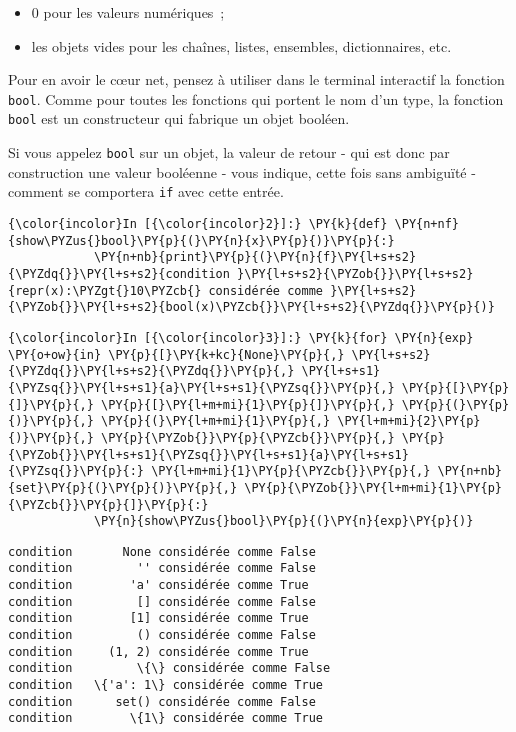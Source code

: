 \begin{itemize}
\tightlist
\item
  0 pour les valeurs numériques~;
\item
  les objets vides pour les chaînes, listes, ensembles, dictionnaires,
  etc.
\end{itemize}

    Pour en avoir le cœur net, pensez à utiliser dans le terminal interactif
la fonction \texttt{bool}. Comme pour toutes les fonctions qui portent
le nom d'un type, la fonction \texttt{bool} est un constructeur qui
fabrique un objet booléen.

Si vous appelez \texttt{bool} sur un objet, la valeur de retour - qui
est donc par construction une valeur booléenne - vous indique, cette
fois sans ambiguïté - comment se comportera \texttt{if} avec cette
entrée.

    \begin{Verbatim}[commandchars=\\\{\},frame=single,framerule=0.3mm,rulecolor=\color{cellframecolor}]
{\color{incolor}In [{\color{incolor}2}]:} \PY{k}{def} \PY{n+nf}{show\PYZus{}bool}\PY{p}{(}\PY{n}{x}\PY{p}{)}\PY{p}{:}
            \PY{n+nb}{print}\PY{p}{(}\PY{n}{f}\PY{l+s+s2}{\PYZdq{}}\PY{l+s+s2}{condition }\PY{l+s+s2}{\PYZob{}}\PY{l+s+s2}{repr(x):\PYZgt{}10\PYZcb{} considérée comme }\PY{l+s+s2}{\PYZob{}}\PY{l+s+s2}{bool(x)\PYZcb{}}\PY{l+s+s2}{\PYZdq{}}\PY{p}{)}
\end{Verbatim}


    \begin{Verbatim}[commandchars=\\\{\},frame=single,framerule=0.3mm,rulecolor=\color{cellframecolor}]
{\color{incolor}In [{\color{incolor}3}]:} \PY{k}{for} \PY{n}{exp} \PY{o+ow}{in} \PY{p}{[}\PY{k+kc}{None}\PY{p}{,} \PY{l+s+s2}{\PYZdq{}}\PY{l+s+s2}{\PYZdq{}}\PY{p}{,} \PY{l+s+s1}{\PYZsq{}}\PY{l+s+s1}{a}\PY{l+s+s1}{\PYZsq{}}\PY{p}{,} \PY{p}{[}\PY{p}{]}\PY{p}{,} \PY{p}{[}\PY{l+m+mi}{1}\PY{p}{]}\PY{p}{,} \PY{p}{(}\PY{p}{)}\PY{p}{,} \PY{p}{(}\PY{l+m+mi}{1}\PY{p}{,} \PY{l+m+mi}{2}\PY{p}{)}\PY{p}{,} \PY{p}{\PYZob{}}\PY{p}{\PYZcb{}}\PY{p}{,} \PY{p}{\PYZob{}}\PY{l+s+s1}{\PYZsq{}}\PY{l+s+s1}{a}\PY{l+s+s1}{\PYZsq{}}\PY{p}{:} \PY{l+m+mi}{1}\PY{p}{\PYZcb{}}\PY{p}{,} \PY{n+nb}{set}\PY{p}{(}\PY{p}{)}\PY{p}{,} \PY{p}{\PYZob{}}\PY{l+m+mi}{1}\PY{p}{\PYZcb{}}\PY{p}{]}\PY{p}{:}
            \PY{n}{show\PYZus{}bool}\PY{p}{(}\PY{n}{exp}\PY{p}{)}
\end{Verbatim}


    \begin{Verbatim}[commandchars=\\\{\},frame=single,framerule=0.3mm,rulecolor=\color{cellframecolor}]
condition       None considérée comme False
condition         '' considérée comme False
condition        'a' considérée comme True
condition         [] considérée comme False
condition        [1] considérée comme True
condition         () considérée comme False
condition     (1, 2) considérée comme True
condition         \{\} considérée comme False
condition   \{'a': 1\} considérée comme True
condition      set() considérée comme False
condition        \{1\} considérée comme True
\end{Verbatim}

